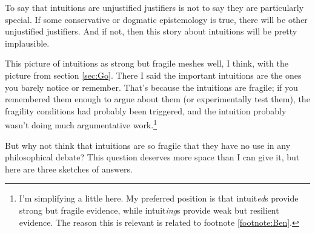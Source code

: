 To say that intuitions are unjustified justifiers is not to say they are particularly special. If some conservative or dogmatic epistemology is true, there will be other unjustified justifiers. And if not, then this story about intuitions will be pretty implausible.

This picture of intuitions as strong but fragile meshes well, I think, with the picture from section \ref{sec:Go}. There I said the important intuitions are the ones you barely notice or remember. That's because the intuitions are fragile; if you remembered them enough to argue about them (or experimentally test them), the fragility conditions had probably been triggered, and the intuition probably wasn't doing much argumentative work.\footnote{I'm simplifying a little here. My preferred position is that intuit\textit{ed}s provide strong but fragile evidence, while intuit\textit{ing}s provide weak but resilient evidence. The reason this is relevant is related to footnote \ref{footnote:Ben}.}

But why not think that intuitions are so fragile that they have no use in any philosophical debate? This question deserves more space than I can give it, but here are three sketches of answers.


